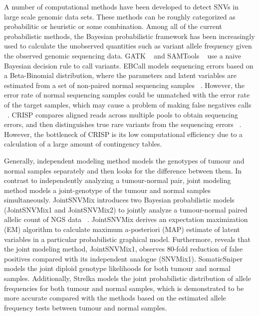 \documentclass[11pt,reqno]{amsart}
\begin{document}
A number of computational methods have been developed to detect SNVs in large scale genomic data sets.
These methods can be roughly categorized as probabilitic or heuristic or some combination.
Among all of the current probabilistic methods, the Bayesian probabilistic framework has been increasingly used to calculate the unobserved quantities such as variant allele frequency given the observed genomic sequencing data.
GATK ~\citep{mckenna2010genome} and SAMTools ~\citep{li2009sequence} use a naive Bayesian decision rule to call variants.
EBCall models sequencing errors based on a Beta-Binomial distribution, where the parameters and latent variables are estimated from a set of non-paired normal sequencing samples ~\citep{shiraishi2013empirical}.
However, the error rate of normal sequencing samples could be unmatched with the error rate of the target samples, which may cause a problem of making false negatives calls ~\citep{wang2013detecting}.
CRISP compares aligned reads across multiple pools to obtain sequencing errors, and then distinguishes true rare variants from the sequencing errors ~\citep{bansal2010statistical}.
However, the bottleneck of CRISP is its low computational efficiency due to a calculation of a large amount of contingency tables.

Generally, independent modeling method models the genotypes of tumour and normal samples separately and then looks for the difference between them.
In contrast to independently analyzing a tumour-normal pair, joint modeling method models a joint-genotype of the tumour and normal samples simultaneously.
JointSNVMix introduces two Bayesian probabilistic models (JointSNVMix1 and JointSNVMix2) to jointly analyze a tumour-normal paired allelic count of NGS data ~\citep{roth2012jointsnvmix}.
JointSNVMix derives an expectation maximization (EM) algorithm to calculate maximum a-posteriori (MAP) estimate of latent variables in a particular probabilistic graphical model.
Furthermore, \citet{roth2012jointsnvmix} reveals that the joint modeling method, JointSNVMix1, observes 80-fold reduction of false positives compared with its independent analogue (SNVMix1).
SomaticSniper ~\citep{larson2012somaticsniper} models the joint diploid genotype likelihoods for both tumour and normal samples.
Additionally, Strelka \citet{saunders2012strelka} models the joint probabilistic distribution of allele frequencies for both tumour and normal samples, which is demonstrated to be more accurate compared with the methods based on the estimated allele frequency tests between tumour and normal samples.
\end{document}
